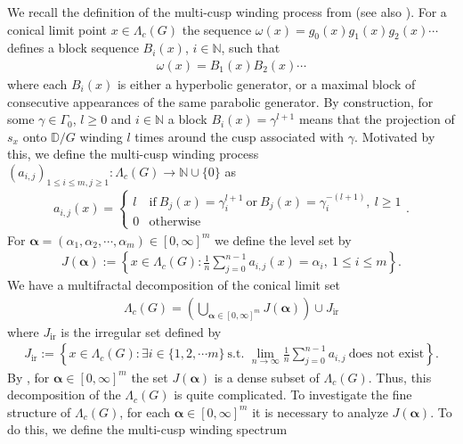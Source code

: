 \documentclass{article}
\theoremstyle{definition}
\begin{document}
We recall the definition of the multi-cusp winding process from \cite{Jaerisch2016AMA} (see also \cite{jaerisch2021mixed}). For a conical limit point $x\in\Lambda_c(G)$ the sequence $\omega(x)=g_0(x)g_1(x)g_2(x)\cdots$ defines a block sequence $B_i(x)$,  $i\in \mathbb{N}$, such that
\begin{align*}
\omega(x)=B_1(x)B_2(x)\cdots    
\end{align*}
 where each $B_i(x)$ is either a hyperbolic generator, or a maximal block of consecutive appearances of the same parabolic generator.
 By construction, for some $\gamma\in\Gamma_0$, $l\geq0$ and $i\in\mathbb{N}$ a block $B_i(x)=\gamma^{l+1}$ means that the projection of $s_x$ onto $\mathbb{D}/G$ winding $l$ times around the cusp associated with $\gamma$. Motivated by this, we define the multi-cusp winding process
$(a_{i,j})_{1\leq i\leq m, j\geq1}:\Lambda_c(G)\rightarrow \mathbb{N}\cup\{0\}$ as 
\begin{align*}
    a_{i,j}(x)= \left\{
 \begin{array}{cc}
   l   & \text{if}\  B_j(x)=\gamma_{i}^{l+1}\ \text{or}\ B_j(x)=\gamma_{i}^{-(l+1)},\ l\geq1\\
   0   & \text{otherwise}
 \end{array}
 \right..
\end{align*}
For $\boldsymbol{\alpha}=(\alpha_1,\alpha_2,\cdots,\alpha_m)\in[0,\infty]^{m}$ we define the level set by 
\begin{align*}
    J(\boldsymbol{\alpha}):=\left\{x\in\Lambda_c(G):\frac{1}{n}\sum_{j=0}^{n-1}a_{i,j}(x)=\alpha_i,\ 1\leq i\leq m\right\}.
\end{align*}
We have a multifractal decomposition of the conical limit set 
\begin{align*}
    \Lambda_c(G)=\left(\bigcup_{\boldsymbol{\alpha}\in[0,\infty]^m}J(\boldsymbol{\alpha}) \right)\cup J_{\text{ir}}
\end{align*}
where $J_{\text{ir}}$ is the irregular set defined by 
\begin{align*}
    J_{\text{ir}}:=\left\{x\in\Lambda_c(G):\exists i\in\{1,2,\cdots m\}\ \text{s.t.\ }\lim_{n\to\infty}\frac{1}{n}\sum_{j=0}^{n-1}a_{i,j}\ \text{does\ not\ exist}\right\}.
\end{align*}
By \cite[Proposition 2.1]{jaerisch2021mixed}, for $\boldsymbol{\alpha}\in[0,\infty]^m$ the set $J(\boldsymbol{\alpha})$ is a dense subset of  $\Lambda_c(G)$. Thus, this decomposition of the $\Lambda_c(G)$ is quite complicated. To investigate the fine structure of $\Lambda_c(G)$, for each $\boldsymbol{\alpha}\in[0,\infty]^m$ it is necessary to analyze $J(\boldsymbol{\alpha})$. To do this, we define the multi-cusp winding spectrum 
\end{document}
